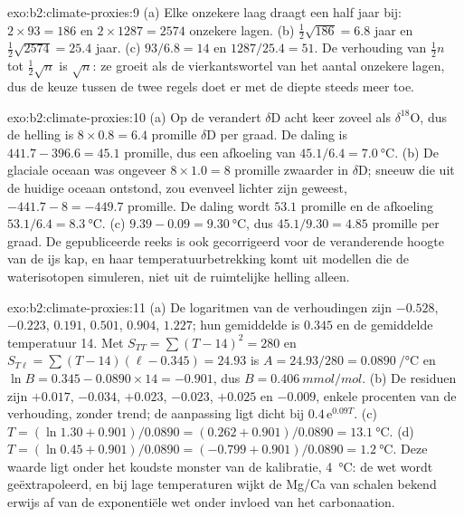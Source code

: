 \begin{solution}{exo:b2:climate-proxies:9}
(a) Elke onzekere laag draagt een half jaar bij: $2 \times 93 = 186$ en $2 \times 1287 = 2574$
onzekere lagen. (b) $\frac12\sqrt{186} = 6.8$ jaar en $\frac12\sqrt{2574} = 25.4$ jaar.
(c) $93/6.8 = 14$ en $1287/25.4 = 51$. De verhouding van $\frac12 n$ tot $\frac12\sqrt{n}$ is
$\sqrt{n}$: ze groeit als de vierkantswortel van het aantal onzekere lagen, dus de keuze tussen
de twee regels doet er met de diepte steeds meer toe.
\end{solution}

\begin{solution}{exo:b2:climate-proxies:10}
(a) Op de  verandert $\delta$D acht keer zoveel als $\delta^{18}$O, dus de
helling is $8 \times 0.8 = 6.4$ promille $\delta$D per graad. De daling is $441.7 - 396.6 = 45.1$
promille, dus een afkoeling van $45.1/6.4 = \qty{7.0}{\celsius}$. (b) De glaciale oceaan was ongeveer
$8 \times 1.0 = 8$ promille zwaarder in $\delta$D; sneeuw die uit de huidige oceaan ontstond, zou evenveel
lichter zijn geweest, $-441.7 - 8 = -449.7$ promille. De daling wordt $53.1$ promille en de afkoeling
$53.1/6.4 = \qty{8.3}{\celsius}$. (c) $9.39 - 0.09 = \qty{9.30}{\celsius}$, dus $45.1/9.30 = 4.85$
promille per graad. De gepubliceerde reeks is ook gecorrigeerd voor de veranderende hoogte van de ijs%
kap, en haar temperatuurbetrekking komt uit modellen die de waterisotopen simuleren, niet uit
de ruimtelijke helling alleen.
\end{solution}

\begin{solution}{exo:b2:climate-proxies:11}
(a) De logaritmen van de verhoudingen zijn $-0.528$, $-0.223$, $0.191$, $0.501$, $0.904$, $1.227$; hun
gemiddelde is $0.345$ en de gemiddelde temperatuur 14. Met $S_{TT} = \sum (T - 14)^2 = 280$ en $S_{T\ell} =
\sum (T - 14)(\ell - 0.345) = 24.93$ is $A = 24.93/280 = \qty{0.0890}{\per\celsius}$ en $\ln B =
0.345 - 0.0890 \times 14 = -0.901$, dus $B = \qty{0.406}{mmol/mol}$. (b) De residuen zijn
$+0.017$, $-0.034$, $+0.023$, $-0.023$, $+0.025$ en $-0.009$, enkele procenten van de verhouding, zonder
trend; de aanpassing ligt dicht bij $0.4\,\mathrm{e}^{0.09T}$. (c) $T = (\ln 1.30 + 0.901)/0.0890 = (0.262 +
0.901)/0.0890 = \qty{13.1}{\celsius}$. (d) $T = (\ln 0.45 + 0.901)/0.0890 = (-0.799 +
0.901)/0.0890 = \qty{1.2}{\celsius}$. Deze waarde ligt onder het koudste monster van de kalibratie,
\qty{4}{\celsius}: de wet wordt geëxtrapoleerd, en bij lage temperaturen wijkt de Mg/Ca van schalen bekend%
erwijs af van de exponentiële wet onder invloed van het carbonaation.
\end{solution}

